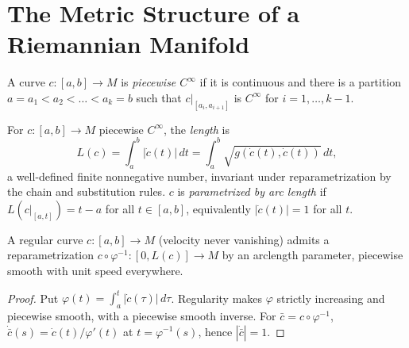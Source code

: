 \section{The Metric Structure of a Riemannian Manifold}

\begin{definition}
  \label{def:pet-ch5-piecewise-smooth-curve}


  A curve $c:[a,b]\to M$ is \emph{piecewise $C^\infty$} if it is continuous and there
  is a partition $a=a_1<a_2<\dots<a_k=b$ such that $c|_{[a_i,a_{i+1}]}$ is $C^\infty$
  for $i=1,\dots,k-1$.
\end{definition}

\begin{definition}
  \label{def:pet-ch5-curve-length}


  For $c:[a,b]\to M$ piecewise $C^\infty$, the \emph{length} is
  \[
    L(c)=\int_a^b|\dot c(t)|\,dt=\int_a^b\sqrt{g(\dot c(t),\dot c(t))}\,dt,
  \]
  a well-defined finite nonnegative number, invariant under reparametrization by the
  chain and substitution rules. $c$ is \emph{parametrized by arc length} if
  $L(c|_{[a,t]})=t-a$ for all $t\in[a,b]$, equivalently $|\dot c(t)|=1$ for all $t$.
\end{definition}

\begin{proposition}
  \label{prop:pet-ch5-arclength-reparametrization}


  A regular curve $c:[a,b]\to M$ (velocity never vanishing) admits a reparametrization
  $c\circ\varphi^{-1}:[0,L(c)]\to M$ by an arclength parameter, piecewise smooth with
  unit speed everywhere.
\end{proposition}
\begin{proof}

  \sketch
  Put $\varphi(t)=\int_a^t|\dot c(\tau)|\,d\tau$.  Regularity makes
  $\varphi$ strictly increasing and piecewise smooth, with a piecewise smooth
  inverse.  For $\bar c=c\circ\varphi^{-1}$,
  $\dot{\bar c}(s)=\dot c(t)/\varphi'(t)$ at $t=\varphi^{-1}(s)$, hence
  $|\dot{\bar c}|=1$.
\end{proof}

